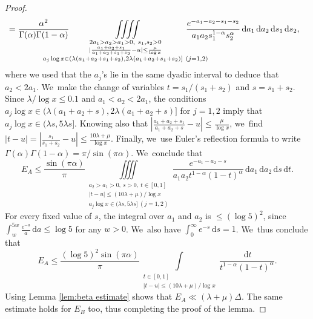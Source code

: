 \documentclass[10pt,a4paper]{article}
\newcommand{\dee}{\,\mathrm{d}}
\theoremstyle{plain}
\theoremstyle{definition}
\begin{document}
\begin{proof}
\[\begin{split}
&= \frac{\alpha^2}{\Gamma(\alpha)\Gamma(1-\alpha)} \mkern-50mu \iiiint\limits_{
\substack{
2a_1>a_2>a_1>0,\ s_1,s_2>0 \\
| \frac{a_1+a_2+s_1}{a_1+a_2+s_1+s_2} - u |\le \frac{\mu}{\log x} \\
a_j\log x \in (\lambda (a_1+a_2+s_1+s_2),2\lambda (a_1+a_2+s_1+s_2)] \ (j=1,2)
} }
\mkern-50mu\frac{e^{-a_1-a_2-s_1-s_2}}
{a_1a_2s_1^{1-\alpha}s_2^\alpha}\dee a_1\dee a_2 \dee s_1\dee s_2,
\end{split}
\]
where we used that the $a_j$'s lie in the same dyadic interval to deduce that $a_2<2a_1$. We~make the change of variables $t=s_1/(s_1+s_2)$ and $s=s_1+s_2$. Since $\lambda/\log x\le 0.1$ and $a_1<a_2<2a_1$, the conditions $a_j\log x \in (\lambda (a_1+a_2+s),2\lambda (a_1+a_2+s)]$ for $j=1,2$ imply that $a_j\log x \in(\lambda s,5\lambda s]$. Knowing also that $ |\frac{a_1+a_2+s_1}{a_1+a_2+s} - u |\le \frac{\mu}{\log x}$, we~find $|t-u|=|\frac{s_1}{s_1+s_2} - u|\le \frac{10\lambda+\mu}{\log x}$. Finally, we~use Euler's reflection formula to write $\Gamma(\alpha)\Gamma(1-\alpha)=\pi/\sin(\pi\alpha)$. We~conclude that
\[
E_A \le \frac{\sin(\pi \alpha)}{\pi}
\iiiint\limits_{
\substack{
a_2>a_1>0,\ s>0,\ t\in[0,1] \\
| t-u|\le (10\lambda+\mu)/\log x\\
a_j\log x \in (\lambda s, 5\lambda s] \ (j=1,2)
} }
\frac{e^{-a_1-a_2-s}}
{a_1a_2t^{1-\alpha}(1-t)^\alpha}\dee a_1\dee a_2 \dee s\dee t.
\]
For every fixed value of $s$, the integral over $a_1$ and $a_2$ is $\le(\log 5)^2$, since $\int_w^{5w}\frac{e^{-a}}{a}\dee a \le \log5$ for any $w>0$. We~also have $\int_0^\infty e^{-s}\dee s=1$. We~thus conclude that
\[
E_A\le \frac{(\log 5)^2\sin(\pi \alpha) }{\pi} \int\limits_{\substack{t\in[0,1] \\ |t-u|\le (10\lambda+\mu)/\log x}} \frac{\dee t}{t^{1-\alpha}(1-t)^\alpha}.
\]
Using Lemma \ref{lem:beta estimate} shows that $E_A\ll (\lambda+\mu)\Delta$. The same estimate holds for $E_B$ too, thus completing the proof of the lemma.
\end{proof}
\end{document}

